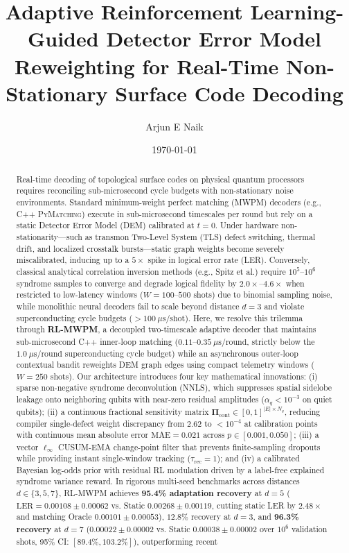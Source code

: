 \documentclass[aps,prxquantum,reprint,superscriptaddress,floatfix,nofootinbib]{revtex4-2}
\begin{document}
\title{Adaptive Reinforcement Learning-Guided Detector Error Model Reweighting for Real-Time Non-Stationary Surface Code Decoding}

\author{Arjun E Naik}

\date{\today}

\begin{abstract}
Real-time decoding of topological surface codes on physical quantum processors requires reconciling sub-microsecond cycle budgets with non-stationary noise environments. Standard minimum-weight perfect matching (MWPM) decoders (e.g., C++ \textsc{PyMatching}) execute in sub-microsecond timescales per round but rely on a static Detector Error Model (DEM) calibrated at $t=0$. Under hardware non-stationarity---such as transmon Two-Level System (TLS) defect switching, thermal drift, and localized crosstalk bursts---static graph weights become severely miscalibrated, inducing up to a $5\times$ spike in logical error rate (LER). Conversely, classical analytical correlation inversion methods (e.g., Spitz et al.) require $10^5$--$10^6$ syndrome samples to converge and degrade logical fidelity by $2.0\times$--$4.6\times$ when restricted to low-latency windows ($W = 100$--$500$ shots) due to binomial sampling noise, while monolithic neural decoders fail to scale beyond distance $d=3$ and violate superconducting cycle budgets ($>100\ \mu\text{s}/\text{shot}$). Here, we resolve this trilemma through \textbf{RL-MWPM}, a decoupled two-timescale adaptive decoder that maintains sub-microsecond C++ inner-loop matching ($0.11$--$0.35\ \mu\text{s}/\text{round}$, strictly below the $1.0\ \mu\text{s}/\text{round}$ superconducting cycle budget) while an asynchronous outer-loop contextual bandit reweights DEM graph edges using compact telemetry windows ($W = 250$ shots). Our architecture introduces four key mathematical innovations: (i) sparse non-negative syndrome deconvolution (NNLS), which suppresses spatial sidelobe leakage onto neighboring qubits with near-zero residual amplitudes ($\alpha_q < 10^{-3}$ on quiet qubits); (ii) a continuous fractional sensitivity matrix $\mathbf{\Pi}_{\text{cont}} \in [0, 1]^{|E| \times N_q}$, reducing compiler single-defect weight discrepancy from $2.62$ to $<10^{-4}$ at calibration points with continuous mean absolute error $\text{MAE} = 0.021$ across $p \in [0.001, 0.050]$; (iii) a vector $\ell_\infty$ CUSUM-EMA change-point filter that prevents finite-sampling dropouts while providing instant single-window tracking ($\tau_{\text{rec}} = 1$); and (iv) a calibrated Bayesian log-odds prior with residual RL modulation driven by a label-free explained syndrome variance reward. In rigorous multi-seed benchmarks across distances $d \in \{3, 5, 7\}$, RL-MWPM achieves \textbf{95.4\% adaptation recovery} at $d=5$ ($\text{LER} = 0.00108 \pm 0.00062$ vs. Static $0.00268 \pm 0.00119$, cutting static LER by $2.48\times$ and matching Oracle $0.00101 \pm 0.00053$), $12.8\%$ recovery at $d=3$, and \textbf{96.3\% recovery} at $d=7$ ($0.00022 \pm 0.00002$ vs. Static $0.00038 \pm 0.00002$ over $10^6$ validation shots, 95\% CI: $[89.4\%, 103.2\%]$), outperforming recent 
\end{abstract}
\end{document}
